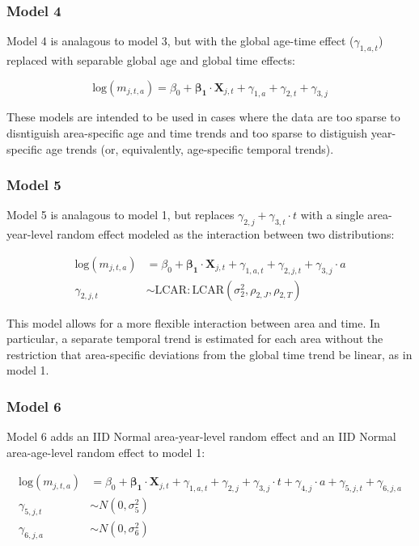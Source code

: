 \documentclass[12pt]{article}
\begin{document}
\subsubsection{Model 4}
	Model 4 is analagous to model 3, but with the global age-time effect ($\gamma_{1,a,t}$) replaced with separable global age and global time effects:

	\begin{equation*}
		\text{log}(m_{j,t,a}) = \beta_0 + \boldsymbol{\beta_1} \cdot \boldsymbol{X}_{j,t} + \gamma_{1,a} + \gamma_{2,t} + \gamma_{3,j}
	\end{equation*}

	These models are intended to be used in cases where the data are too sparse to disntiguish area-specific age and time trends and too sparse
	to distiguish year-specific age trends (or, equivalently, age-specific temporal trends).

\subsubsection{Model 5}
	Model 5 is analagous to model 1, but replaces $\gamma_{2,j} + \gamma_{3,t} \cdot t$ with a single area-year-level random effect modeled as the interaction between two  distributions: 

	\begin{align*}
		\text{log}(m_{j,t,a}) &= \beta_0 + \boldsymbol{\beta_1} \cdot \boldsymbol{X}_{j,t} + \gamma_{1,a,t} + \gamma_{2,j,t} + \gamma_{3,j} \cdot a \\
		\gamma_{2,j,t} &\sim \text{LCAR}:\text{LCAR}(\sigma^2_2,\rho_{2,J}, \rho_{2,T})
	\end{align*}

	This model allows for a more flexible interaction between area and time. In particular, a separate temporal trend is estimated for each area without the restriction that area-specific deviations from the global time trend be linear, as in model 1. 

\subsubsection{Model 6}
	Model 6 adds an IID Normal area-year-level random effect and an IID Normal area-age-level random effect to model 1:

	\begin{align*}
		\text{log}(m_{j,t,a}) &= \beta_0 + \boldsymbol{\beta_1} \cdot \boldsymbol{X}_{j,t} + \gamma_{1,a,t} + \gamma_{2,j} + \gamma_{3,j} \cdot t + \gamma_{4,j} \cdot a + \gamma_{5,j,t} + \gamma_{6,j,a} \\
		\gamma_{5,j,t} &\sim N(0, \sigma^2_5) \\
		\gamma_{6,j,a} &\sim N(0, \sigma^2_6) 
	\end{align*}
\end{document}
